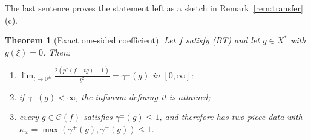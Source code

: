 \documentclass[10pt]{amsart}
\newtheorem{theorem}{Theorem}[section]
\theoremstyle{definition}
\theoremstyle{remark}
\newcommand{\Cset}{\mathcal C}
\begin{document}
The last sentence proves the statement left as a sketch in
Remark~\ref{rem:transfer}(c).

\begin{theorem}[Exact one-sided coefficient]\label{thm:onesided}
Let $f$ satisfy \textup{(BT)} and let $g\in X^*$ with $g(\xi)=0$.  Then:
\begin{enumerate}
\item[(a)] $\displaystyle\lim_{t\to0^\pm}\frac{2(p^*(f+tg)-1)}{t^2}=
\gamma^\pm(g)$ in $[0,\infty]$;
\item[(b)] if $\gamma^\pm(g)<\infty$, the infimum defining it is attained;
\item[(c)] every $g\in\Cset(f)$ satisfies $\gamma^\pm(g)\le1$, and therefore
has two-piece data with $\kappa_w=\max(\gamma^+(g),\gamma^-(g))\le1$.
\end{enumerate}
\end{theorem}
\end{document}
